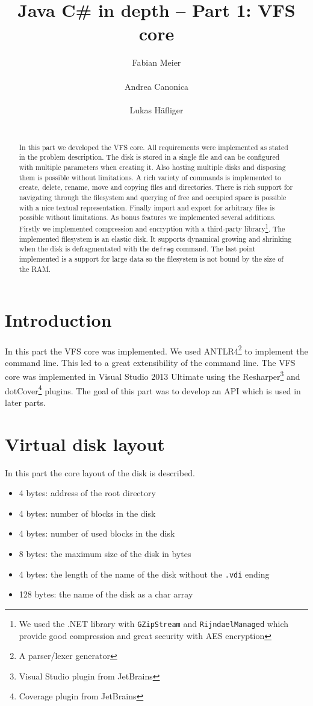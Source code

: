 \documentclass{report}
\title{Java C\# in depth -- Part 1: VFS core}
\author{
\alignauthor Fabian Meier\\
	\affaddr{ETH ID 10-919-280}\\
	\email{meiefabi@student.ethz.ch}
\alignauthor Andrea Canonica\\
	\affaddr{ETH ID 10-293-116}\\
	\email{canandre@student.ethz.ch}
\alignauthor Lukas H\"afliger\\
	\affaddr{ETH ID 11-916-376}\\
	\email{haelukas@student.ethz.ch}
}
\begin{document}
\maketitle

\begin{abstract}
In this part we developed the VFS core. All requirements were implemented as stated in the problem description. The disk is stored in a single file and can be configured with multiple parameters when creating it. Also hosting multiple disks and disposing them is possible without limitations. A rich variety of commands is implemented to create, delete, rename, move and copying files and directories. There is rich support for navigating through the filesystem and querying of free and occupied space is possible with a nice textual representation. Finally import and export for arbitrary files is possible without limitations. As bonus features we implemented several additions. Firstly we implemented compression and encryption with a third-party library\footnote{We used the .NET library with \texttt{GZipStream} and \texttt{RijndaelManaged} which provide good compression and great security with AES encryption}. The implemented filesystem is an elastic disk. It supports dynamical growing and shrinking when the disk is defragmentated with the \texttt{defrag} command. The last point implemented is a support for large data so the filesystem is not bound by the size of the RAM.
\end{abstract}

\section{Introduction}
In this part the VFS core was implemented. We used ANTLR4\footnote{A parser/lexer generator} to implement the command line. This led to a great extensibility of the command line. The VFS core was implemented in Visual Studio 2013 Ultimate using the Resharper\footnote{Visual Studio plugin from JetBrains} and dotCover\footnote{Coverage plugin from JetBrains} plugins. The goal of this part was to develop an API which is used in later parts. 

\section{Virtual disk layout}
In this part the core layout of the disk is described. 
\begin{itemize}
\item 4 bytes: address of the root directory
\item 4 bytes: number of blocks in the disk
\item 4 bytes: number of used blocks in the disk
\item 8 bytes: the maximum size of the disk in bytes
\item 4 bytes: the length of the name of the disk without the \texttt{.vdi} ending
\item 128 bytes: the name of the disk as a char array
\end{itemize}
\end{document}
